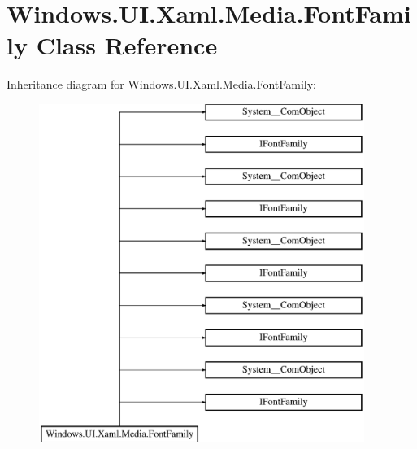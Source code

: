\hypertarget{class_windows_1_1_u_i_1_1_xaml_1_1_media_1_1_font_family}{}\section{Windows.\+U\+I.\+Xaml.\+Media.\+Font\+Family Class Reference}
\label{class_windows_1_1_u_i_1_1_xaml_1_1_media_1_1_font_family}
Inheritance diagram for Windows.\+U\+I.\+Xaml.\+Media.\+Font\+Family\+:\begin{figure}[H]
\begin{center}
\leavevmode
\includegraphics[height=11.000000cm]{class_windows_1_1_u_i_1_1_xaml_1_1_media_1_1_font_family}
\end{center}
\end{figure}
